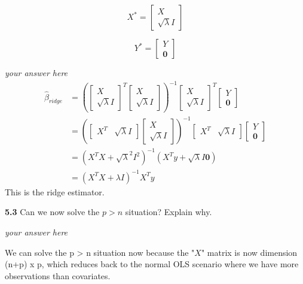\documentclass[11pt]{article}
\begin{document}
\[X^* = \begin{bmatrix} X \\ \sqrt{\lambda}I \end{bmatrix}\]

\[Y^* = \begin{bmatrix} Y \\ \textbf{0} \end{bmatrix}\]

    \emph{your answer here} \[
\begin{align}
\hat{\beta}_{ridge} &= (\begin{bmatrix} X \\ \sqrt{\lambda}I \end{bmatrix}^T\begin{bmatrix} X \\ \sqrt{\lambda}I \end{bmatrix})^{-1}\begin{bmatrix} X \\ \sqrt{\lambda}I \end{bmatrix}^T\begin{bmatrix} Y \\ \textbf{0} \end{bmatrix} \\
&= (\begin{bmatrix} X^T & \sqrt{\lambda}I \end{bmatrix}\begin{bmatrix} X \\ \sqrt{\lambda}I \end{bmatrix})^{-1}\begin{bmatrix} X^T & \sqrt{\lambda}I \end{bmatrix}\begin{bmatrix} Y \\ \textbf{0} \end{bmatrix} \\
&= (X^TX+\sqrt{\lambda}^2 I^2)^{-1}(X^Ty+\sqrt{\lambda}I\textbf{0} ) \\
&= (X^TX+\lambda I)^{-1}X^Ty
\end{align}
\] This is the ridge estimator.

    \textbf{5.3} Can we now solve the \(p > n\) situation? Explain why.

    \emph{your answer here}

We can solve the p \textgreater{} n situation now because the "\(X\)"
matrix is now dimension (n+p) x p, which reduces back to the normal OLS
scenario where we have more observations than covariates.
\end{document}
